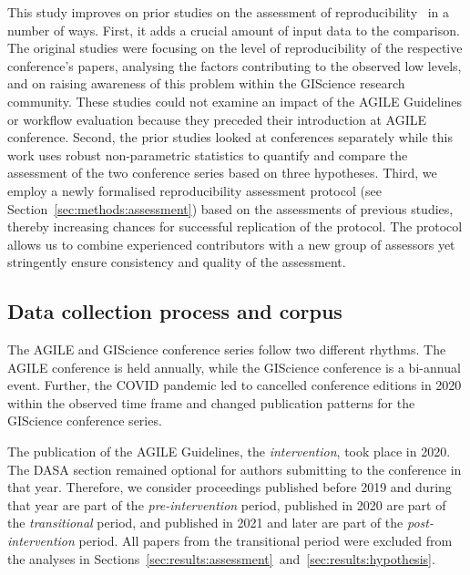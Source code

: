 \documentclass{josis}
\begin{document}
This study improves on prior studies on the assessment of reproducibility~\cite{nust2018,ostermann2021} in a number of ways.
First, it adds a crucial amount of input data to the comparison.
The original studies were focusing on the level of reproducibility of the respective conference's papers, analysing the factors contributing to the observed low levels, and on raising awareness of this problem within the GIScience research community.
These studies could not examine an impact of the AGILE Guidelines or workflow evaluation because they preceded their introduction at AGILE conference.
Second, the prior studies looked at conferences separately while this work uses robust non-parametric statistics to quantify and compare the assessment of the two conference series based on three hypotheses.
Third, we employ a newly formalised reproducibility assessment protocol (see Section~\ref{sec:methods:assessment}) based on the assessments of previous studies, thereby increasing chances for successful replication of the protocol.
The protocol allows us to combine experienced contributors with a new group of assessors yet stringently ensure consistency and quality of the assessment.

\subsection{Data collection process and corpus}
\label{sec:methods:corpus}

The AGILE and GIScience conference series follow two different rhythms. The AGILE conference is held annually, while the GIScience conference is a bi-annual event.
Further, the COVID pandemic led to cancelled conference editions in 2020 within the observed time frame and changed publication patterns for the GIScience conference series.

The publication of the AGILE Guidelines, the \emph{intervention}, took place in 2020. The DASA section remained optional for authors submitting to the conference in that year. 
Therefore, we consider proceedings published before 2019 and during that year are part of the \emph{pre-intervention} period, published in 2020 are part of the \emph{transitional} period, and published in 2021 and later are part of the \emph{post-intervention} period.
All papers from the transitional period were excluded from the analyses in Sections~\ref{sec:results:assessment}~and~\ref{sec:results:hypothesis}.
\end{document}
